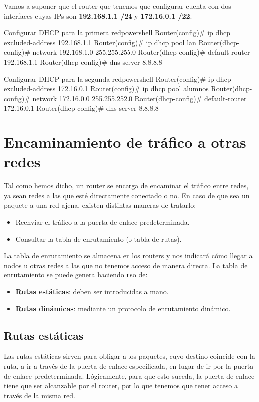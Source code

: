 Vamos a suponer que el router que tenemos que configurar cuenta con dos interfaces cuyas IPs son \textbf{192.168.1.1 /24} y \textbf{172.16.0.1 /22}.

\begin{mycode}{Configurar DHCP para la primera red}{powershell}{}
Router(config)# ip dhcp excluded-address 192.168.1.1
Router(config)# ip dhcp pool lan
Router(dhcp-config)# network 192.168.1.0 255.255.255.0
Router(dhcp-config)# default-router 192.168.1.1
Router(dhcp-config)# dns-server 8.8.8.8
\end{mycode}

\begin{mycode}{Configurar DHCP para la segunda red}{powershell}{}
Router(config)# ip dhcp excluded-address 172.16.0.1
Router(config)# ip dhcp pool alumnos
Router(dhcp-config)# network 172.16.0.0 255.255.252.0
Router(dhcp-config)# default-router 172.16.0.1
Router(dhcp-config)# dns-server 8.8.8.8
\end{mycode}



\section{Encaminamiento de tráfico a otras redes}
Tal como hemos dicho, un router se encarga de encaminar el tráfico entre redes, ya sean redes a las que esté directamente conectado o no. En caso de que sea un paquete a una red ajena, existen distintas maneras de tratarlo:

\begin{itemize}
    \item Reenviar el tráfico a la puerta de enlace predeterminada.
    \item Consultar la tabla de enrutamiento (o tabla de rutas).
\end{itemize}

La tabla de enrutamiento se almacena en los routers y nos indicará cómo llegar a nodos u otras redes a las que no tenemos acceso de manera directa. La tabla de enrutamiento se puede genera haciendo uso de:

\begin{itemize}
    \item \textbf{Rutas estáticas}: deben ser introducidas a mano.
    \item \textbf{Rutas dinámicas}: mediante un protocolo de enrutamiento dinámico.
\end{itemize}


\hypertarget{rutas_estaticas}{}
\subsection{Rutas estáticas}
Las rutas estáticas sirven para obligar a los paquetes, cuyo destino coincide con la ruta, a ir a través de la puerta de enlace especificada, en lugar de ir por la puerta de enlace predeterminada. Lógicamente, para que esto suceda, la puerta de enlace tiene que ser alcanzable por el router, por lo que tenemos que tener acceso a través de la misma red.


